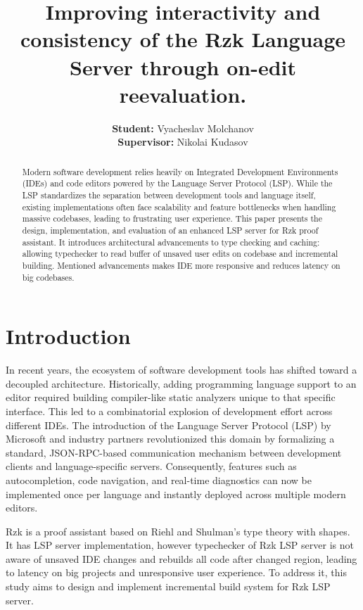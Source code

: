 \documentclass[12pt, a4paper]{article}
\title{\textbf{Improving interactivity and consistency of the Rzk Language Server through on-edit reevaluation.}}
\author{\textbf{Student:} Vyacheslav Molchanov \\ \textbf{Supervisor:} Nikolai Kudasov}
\date{}
\begin{document}
\maketitle

\begin{abstract}
Modern software development relies heavily on Integrated Development Environments (IDEs) and code editors powered by the Language Server Protocol (LSP).
While the LSP standardizes the separation between development tools and language itself, existing implementations often face scalability and feature bottlenecks when handling massive codebases, leading to frustrating user experience.
This paper presents the design, implementation, and evaluation of an enhanced LSP server for Rzk proof assistant.
It introduces architectural advancements to type checking and caching: allowing typechecker to read buffer of unsaved user edits on codebase and incremental building.
Mentioned advancements makes IDE more responsive and reduces latency on big codebases.
\end{abstract}

\newpage

\section{Introduction}
In recent years, the ecosystem of software development tools has shifted toward a decoupled architecture.
Historically, adding programming language support to an editor required building compiler-like static analyzers unique to that specific interface.
This led to a combinatorial explosion of development effort across different IDEs.
The introduction of the Language Server Protocol (LSP) by Microsoft \cite{lspspecification} and industry partners revolutionized this domain by formalizing a standard, JSON-RPC-based communication mechanism between development clients and language-specific servers.
Consequently, features such as autocompletion, code navigation, and real-time diagnostics can now be implemented once per language and instantly deployed across multiple modern editors.

Rzk is a proof assistant based on Riehl and Shulman's type theory \cite{riehl2023typetheorysyntheticinftycategories} with shapes.
It has LSP server implementation, however typechecker of Rzk LSP server is not aware of unsaved IDE changes and rebuilds all code after changed region, leading to latency on big projects and unresponsive user experience. To address it, this study aims to design and implement incremental build system \cite{lacarte} for Rzk LSP server.
\end{document}
